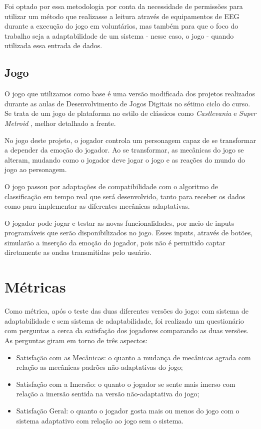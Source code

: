 Foi optado por essa metodologia por conta da necessidade de permissões para utilizar um método que realizasse a leitura através de equipamentos de EEG durante a execução do jogo em voluntários, mas também para que o foco do trabalho seja a adaptabilidade de um sistema - nesse caso, o jogo - quando utilizada essa entrada de dados. 

\subsection{Jogo}
O jogo que utilizamos como base é uma versão modificada dos projetos realizados durante as aulas de Desenvolvimento de Jogos Digitais no sétimo ciclo do curso. Se trata de um jogo de plataforma no estilo de clássicos como \textit{Castlevania} \cite{castlevania} e \textit{Super Metroid} \cite{supermetroid}, melhor detalhado a frente.

No jogo deste projeto, o jogador controla um personagem capaz de se transformar a depender da emoção do jogador. Ao se transformar, as mecânicas do jogo se alteram, mudando como o jogador deve jogar o jogo e as reações do mundo do jogo ao personagem.

O jogo passou por adaptações de compatibilidade com o algoritmo de classificação em tempo real que será desenvolvido, tanto para receber os dados como para implementar as diferentes mecânicas adaptativas.

O jogador pode jogar e testar as novas funcionalidades, por meio de inputs programáveis que serão disponibilizados no jogo. Esses inputs, através de botões, simularão a inserção da emoção do jogador, pois não é permitido captar diretamente as ondas transmitidas pelo usuário.

\section{Métricas}

Como métrica, após o teste das duas diferentes versões do jogo: com sistema de adaptabilidade e sem sistema de adaptabilidade, foi realizado um questionário com perguntas a cerca da satisfação dos jogadores comparando as duas versões. As perguntas giram em torno de três aspectos: 

\begin{itemize}
  \item Satisfação com as Mecânicas: o quanto a mudança de mecânicas agrada com relação as mecânicas padrões não-adaptativas do jogo;
  \item Satisfação com a Imersão: o quanto o jogador se sente mais imerso com relação a imersão sentida na versão não-adaptativa do jogo;
  \item Satisfação Geral: o quanto o jogador gosta mais ou menos do jogo com o sistema adaptativo com relação ao jogo sem o sistema.
\end{itemize}

